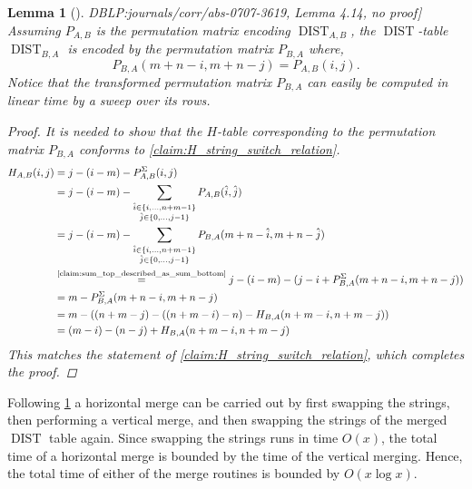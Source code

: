 \documentclass[twoside,11pt,openright]{report}
\newcommand{\DIST}{\operatorname{DIST}}
\newcommand{\refbook}[2]{\cite[#1]{DBLP:journals/corr/abs-0707-3619}, #2}
\newtheorem{lemma}{Lemma}
\begin{document}
\begin{lemma}[\refbook{p.-52}{Lemma 4.14, no proof}]
  \label{lemma:swap_strings}
  Assuming $P_{A,B}$ is the permutation matrix encoding $\DIST_{A,B}$, the $\DIST$-table $\DIST_{B,A}$ is encoded by the permutation matrix $P_{B,A}$ where,
  \[
    P_{B,A}(m + n - i, m + n - j) = P_{A,B}(i, j).
  \]
  Notice that the transformed permutation matrix $P_{B,A}$ can easily be computed in linear time by a sweep over its rows.
  \begin{proof}
    It is needed to show that the $H$-table corresponding to the permutation matrix $P_{B,A}$ conforms to \cref{claim:H_string_switch_relation}.
    \begin{align*}
      H_{A,B}(i, j) &= j - (i - m) - P_{A,B}^{\Sigma}(i, j) \\
        &= j - (i - m) - \sum_{\substack{ \hat{i} \in \{i,\dots,n+m - 1\} \\ \hat{j} \in \{0, \dots, j - 1\}}} P_{A,B}(\hat{i}, \hat{j}) \\
        &= j - (i - m) - \sum_{\substack{ \hat{i} \in \{i, \dots, n + m - 1\} \\ \hat{j} \in \{ 0, \dots, j - 1 \}}} P_{B,A}(m + n - \hat{i}, m + n - \hat{j}) \\
        &\overset{\text{\cref{claim:sum_top_described_as_sum_bottom}}}{=} j - (i - m) - (j - i + P_{B,A}^{\Sigma}(m + n - i, m + n - j)) \\
        &= m - P_{B,A}^{\Sigma}(m + n - i, m + n - j) \\
        &= m - \left( (n + m - j) - ((n + m - i) - n) - H_{B,A}(n + m - i, n + m - j) \right) \\
        &= (m - i) - (n - j) + H_{B,A}(n + m - i, n + m - j)
    \end{align*}
    This matches the statement of \cref{claim:H_string_switch_relation}, which completes the proof.
  \end{proof}
\end{lemma}
%
Following \cref{lemma:swap_strings} a horizontal merge can be carried out by first swapping the strings, then performing a vertical merge, and then swapping the strings of the merged $\DIST$ table again. Since swapping the strings runs in time $O(x)$, the total time of a horizontal merge is bounded by the time of the vertical merging. Hence, the total time of either of the merge routines is bounded by $O(x\log{x})$.
\end{document}
